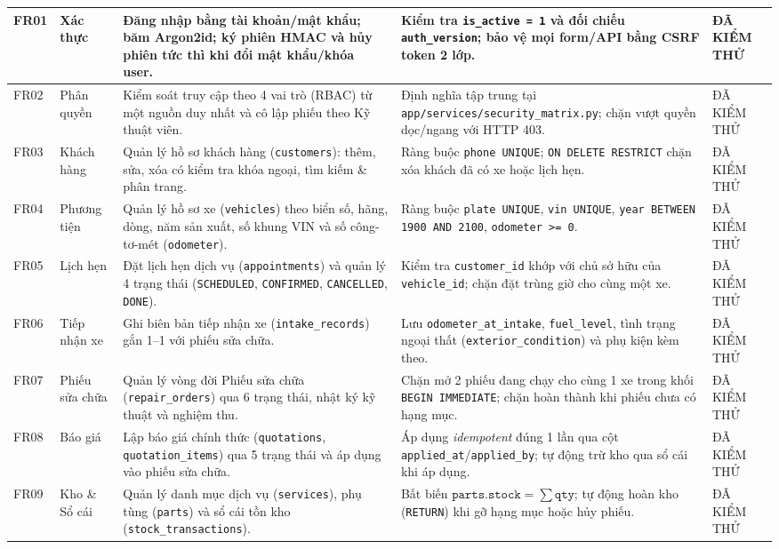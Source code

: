 \begin{small}
\begin{longtable}{|C{1.0cm}|L{2.1cm}|L{3.9cm}|L{4.6cm}|C{2.1cm}|}
FR01 & Xác thực & Đăng nhập bằng tài khoản/mật khẩu; băm Argon2id; ký phiên HMAC và hủy phiên tức thì khi đổi mật khẩu/khóa user. & Kiểm tra \texttt{is\_active = 1} và đối chiếu \texttt{auth\_version}; bảo vệ mọi form/API bằng CSRF token 2 lớp. & ĐÃ KIỂM THỬ\\
\hline
FR02 & Phân quyền & Kiểm soát truy cập theo 4 vai trò (RBAC) từ một nguồn duy nhất và cô lập phiếu theo Kỹ thuật viên. & Định nghĩa tập trung tại \texttt{app/services/\allowbreak security\_matrix.py}; chặn vượt quyền dọc/ngang với HTTP 403. & ĐÃ KIỂM THỬ\\
\hline
FR03 & Khách hàng & Quản lý hồ sơ khách hàng (\texttt{customers}): thêm, sửa, xóa có kiểm tra khóa ngoại, tìm kiếm \& phân trang. & Ràng buộc \texttt{phone UNIQUE}; \texttt{ON DELETE RESTRICT} chặn xóa khách đã có xe hoặc lịch hẹn. & ĐÃ KIỂM THỬ\\
\hline
FR04 & Phương tiện & Quản lý hồ sơ xe (\texttt{vehicles}) theo biển số, hãng, dòng, năm sản xuất, số khung VIN và số công-tơ-mét (\texttt{odometer}). & Ràng buộc \texttt{plate UNIQUE}, \texttt{vin UNIQUE}, \texttt{year BETWEEN 1900 AND 2100}, \texttt{odometer >= 0}. & ĐÃ KIỂM THỬ\\
\hline
FR05 & Lịch hẹn & Đặt lịch hẹn dịch vụ (\texttt{appointments}) và quản lý 4 trạng thái (\texttt{SCHEDULED}, \texttt{CONFIRMED}, \texttt{CANCELLED}, \texttt{DONE}). & Kiểm tra \texttt{customer\_id} khớp với chủ sở hữu của \texttt{vehicle\_id}; chặn đặt trùng giờ cho cùng một xe. & ĐÃ KIỂM THỬ\\
\hline
FR06 & Tiếp nhận xe & Ghi biên bản tiếp nhận xe (\texttt{intake\_records}) gắn 1--1 với phiếu sửa chữa. & Lưu \texttt{odometer\_at\_intake}, \texttt{fuel\_level}, tình trạng ngoại thất (\texttt{exterior\_condition}) và phụ kiện kèm theo. & ĐÃ KIỂM THỬ\\
\hline
FR07 & Phiếu sửa chữa & Quản lý vòng đời Phiếu sửa chữa (\texttt{repair\_orders}) qua 6 trạng thái, nhật ký kỹ thuật và nghiệm thu. & Chặn mở 2 phiếu đang chạy cho cùng 1 xe trong khối \texttt{BEGIN IMMEDIATE}; chặn hoàn thành khi phiếu chưa có hạng mục. & ĐÃ KIỂM THỬ\\
\hline
FR08 & Báo giá & Lập báo giá chính thức (\texttt{quotations}, \texttt{quotation\_items}) qua 5 trạng thái và áp dụng vào phiếu sửa chữa. & Áp dụng \textit{idempotent} đúng 1 lần qua cột \texttt{applied\_at}/\texttt{applied\_by}; tự động trừ kho qua sổ cái khi áp dụng. & ĐÃ KIỂM THỬ\\
\hline
FR09 & Kho \& Sổ cái & Quản lý danh mục dịch vụ (\texttt{services}), phụ tùng (\texttt{parts}) và sổ cái tồn kho (\texttt{stock\_transactions}). & Bất biến $\texttt{parts.stock} = \sum \texttt{qty}$; tự động hoàn kho (\texttt{RETURN}) khi gỡ hạng mục hoặc hủy phiếu. & ĐÃ KIỂM THỬ\\

\end{longtable}
\end{small}
